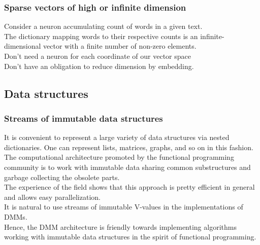 \documentclass{beamer}
\newcommand{\msgray}[1]{{\color{mygray} #1}}
\begin{document}
\begin{frame}

  \frametitle{Sparse vectors of high or infinite dimension}

Consider a neuron accumulating count of words in a given text.\\[2ex]

The dictionary mapping words to their respective counts is an infinite-dimensional vector
with a finite number of non-zero elements.\\[2ex]

Don't need a neuron for each coordinate of our vector space\\[2ex]

Don't have an obligation to reduce dimension by embedding.

\end{frame}





\subsection{Data structures}



\begin{frame}

  \frametitle{Streams of immutable data structures}

It is convenient to represent a large variety of data structures via nested dictionaries. One can represent lists, matrices, graphs, and so on in this fashion.\\[1ex]

\msgray{The computational architecture promoted by the functional programming community is to work with immutable data sharing common substructures and garbage collecting the obsolete parts.\\[1ex]

The experience of the field shows that this approach is pretty efficient in general and allows easy parallelization.\\[1ex]

It is natural to use streams of immutable V-values in the implementations of DMMs.\\[1ex]

Hence, the DMM architecture is friendly towards implementing algorithms working with immutable data structures in
the spirit of functional programming.}

\end{frame}
\end{document}
